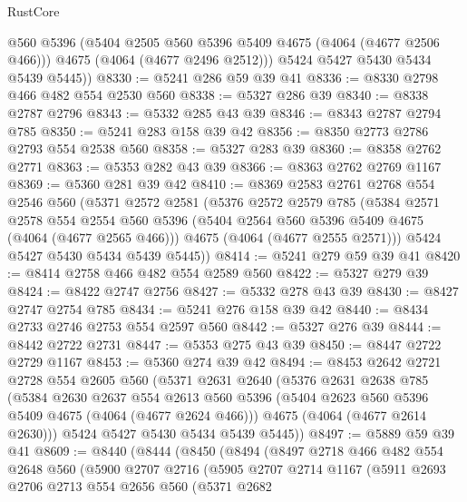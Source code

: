 \begin{lexlean}{RustCore}
\begin{coremodule}
          @560
          @5396
          (@5404 @2505 @560 @5396 @5409 @4675 (@4064 (@4677 @2506 @466)))
          @4675
          (@4064 (@4677 @2496 @2512)))
        @5424
        @5427
        @5430
        @5434
        @5439
        @5445))
@8330 := @5241 @286 @59 @39 @41
@8336 := @8330 @2798 @466 @482 @554 @2530 @560
@8338 := @5327 @286 @39
@8340 := @8338 @2787 @2796
@8343 := @5332 @285 @43 @39
@8346 := @8343 @2787 @2794 @785
@8350 := @5241 @283 @158 @39 @42
@8356 := @8350 @2773 @2786 @2793 @554 @2538 @560
@8358 := @5327 @283 @39
@8360 := @8358 @2762 @2771
@8363 := @5353 @282 @43 @39
@8366 := @8363 @2762 @2769 @1167
@8369 := @5360 @281 @39 @42
@8410 := @8369
    @2583
    @2761
    @2768
    @554
    @2546
    @560
    (@5371
      @2572
      @2581
      (@5376
        @2572
        @2579
        @785
        (@5384
          @2571
          @2578
          @554
          @2554
          @560
          @5396
          (@5404 @2564 @560 @5396 @5409 @4675 (@4064 (@4677 @2565 @466)))
          @4675
          (@4064 (@4677 @2555 @2571)))
        @5424
        @5427
        @5430
        @5434
        @5439
        @5445))
@8414 := @5241 @279 @59 @39 @41
@8420 := @8414 @2758 @466 @482 @554 @2589 @560
@8422 := @5327 @279 @39
@8424 := @8422 @2747 @2756
@8427 := @5332 @278 @43 @39
@8430 := @8427 @2747 @2754 @785
@8434 := @5241 @276 @158 @39 @42
@8440 := @8434 @2733 @2746 @2753 @554 @2597 @560
@8442 := @5327 @276 @39
@8444 := @8442 @2722 @2731
@8447 := @5353 @275 @43 @39
@8450 := @8447 @2722 @2729 @1167
@8453 := @5360 @274 @39 @42
@8494 := @8453
    @2642
    @2721
    @2728
    @554
    @2605
    @560
    (@5371
      @2631
      @2640
      (@5376
        @2631
        @2638
        @785
        (@5384
          @2630
          @2637
          @554
          @2613
          @560
          @5396
          (@5404 @2623 @560 @5396 @5409 @4675 (@4064 (@4677 @2624 @466)))
          @4675
          (@4064 (@4677 @2614 @2630)))
        @5424
        @5427
        @5430
        @5434
        @5439
        @5445))
@8497 := @5889 @59 @39 @41
@8609 := @8440
    (@8444
      (@8450
        (@8494
          (@8497
            @2718
            @466
            @482
            @554
            @2648
            @560
            (@5900
              @2707
              @2716
              (@5905
                @2707
                @2714
                @1167
                (@5911
                  @2693
                  @2706
                  @2713
                  @554
                  @2656
                  @560
                  (@5371
                    @2682

\end{coremodule}
\end{lexlean}
